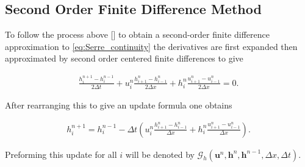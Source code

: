 \documentclass[SingleSpace,12pt,Proceedings]{Serre_ASCE}
\begin{document}
\subsection{Second Order Finite Difference Method}
To follow the process above [] to obtain a second-order finite difference approximation to \eqref{eq:Serre_continuity} the derivatives are first expanded then approximated by second order centered finite differences to give
\begin{linenomath*}
\begin{gather}
\frac{h^{n+1}_i - h^{n-1}_i}{2\Delta t} + u^{n}_{i}\frac{h^{n}_{i+1} - h^{n}_{i-1}}{2\Delta x} + h^{n}_{i}\frac{u^{n}_{i+1} - u^{n}_{i-1}}{2\Delta x} = 0.
\end{gather}
\end{linenomath*}
After rearranging this to give an update formula one obtains
\begin{linenomath*}
\begin{gather}
h^{n+1}_i = h^{n-1}_i - \Delta t \left(u^{n}_{i}\frac{h^{n}_{i+1} - h^{n}_{i-1}}{\Delta x} + h^{n}_{i}\frac{u^{n}_{i+1} - u^{n}_{i-1}}{\Delta x}\right).
\end{gather}
\end{linenomath*}
Preforming this update for all $i$ will be denoted by $\mathcal{G}_h\left(\boldsymbol{u}^n,\boldsymbol{h}^n,\boldsymbol{h}^{n-1} ,\Delta x, \Delta t \right)$.
\end{document}
